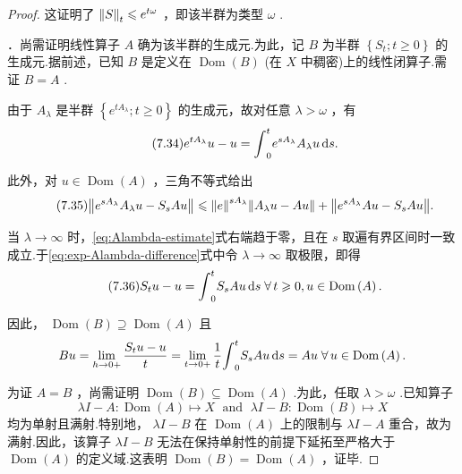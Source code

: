 \begin{proof}
这证明了 $\norm{S}_{t} \leqslant  {e}^{t\omega }$ ，即该半群为类型 $\omega$ .

．尚需证明线性算子 $A$ 确为该半群的生成元.为此，记 $B$ 为半群 $\left\{  {{S}_{t};t \geq  0}\right\}$ 的生成元.据前述，已知 $B$ 是定义在 $\operatorname{Dom}\left( B\right)$ (在 $X$ 中稠密)上的线性闭算子.需证 $B = A$ .

由于 ${A}_{\lambda }$ 是半群 $\left\{  {{e}^{t{A}_{\lambda }};t \geq  0}\right\}$ 的生成元，故对任意 $\lambda  > \omega$ ，有
\begin{equation}\tag{7.34}\label{eq:exp-Alambda-difference}
{e}^{t{A}_{\lambda }}u - u = {\int }_{0}^{t}{e}^{s{A}_{\lambda }}{A}_{\lambda }{u\mathop{}\!\mathrm{d} s}.
\end{equation}

此外，对 $u \in  \operatorname{Dom}\left( A\right)$ ，三角不等式给出
\begin{equation}\tag{7.35}\label{eq:Alambda-estimate}
\norm{{e}^{s{A}_{\lambda }}{A}_{\lambda }u - {S}_{s}{Au}}  \leqslant   \norm{e}^{s{A}_{\lambda }}\norm{{A}_{\lambda }u - {Au}} + \norm{{e}^{s{A}_{\lambda }}{Au} - {S}_{s}{Au}}.
\end{equation}

当 $\lambda  \rightarrow  \infty$ 时，\eqref{eq:Alambda-estimate}式右端趋于零，且在 $s$ 取遍有界区间时一致成立.于\eqref{eq:exp-Alambda-difference}式中令 $\lambda  \rightarrow  \infty$ 取极限，即得
\begin{equation}\tag{7.36}\label{eq:semigroup-variation-of-constants-linear}
{S}_{t}u - u = {\int }_{0}^{t}{S}_{s}{Au\mathop{}\!\mathrm{d} s}\;\forall\,t \geqslant  0,u \in  \operatorname{Dom}\left( A\right) .
\end{equation}

因此， $\operatorname{Dom}\left( B\right)  \supseteq  \operatorname{Dom}\left( A\right)$ 且
\[
{Bu} = \mathop{\lim }\limits_{{h \rightarrow  0 + }}\frac{{S}_{t}u - u}{t} = \mathop{\lim }\limits_{{t \rightarrow  0 + }}\frac{1}{t}{\int }_{0}^{t}{S}_{s}{Au\mathop{}\!\mathrm{d} s} = {Au}\;\forall\,u \in  \operatorname{Dom}\left( A\right) .
\]

为证 $A = B$ ，尚需证明 $\operatorname{Dom}\left( B\right)  \subseteq  \operatorname{Dom}\left( A\right)$ .为此，任取 $\lambda  > \omega$ .已知算子
\[
{\lambda I} - A : \operatorname{Dom}\left( A\right)  \mapsto  X\;\text{ and }\;{\lambda I} - B : \operatorname{Dom}\left( B\right)  \mapsto  X
\]
均为单射且满射.特别地， ${\lambda I} - B$ 在 $\operatorname{Dom}\left( A\right)$ 上的限制与 ${\lambda I} - A$ 重合，故为满射.因此，该算子 ${\lambda I} - B$ 无法在保持单射性的前提下延拓至严格大于 $\operatorname{Dom}\left( A\right)$ 的定义域.这表明 $\operatorname{Dom}\left( B\right)  = \operatorname{Dom}\left( A\right)$ ，证毕.
\end{proof}

